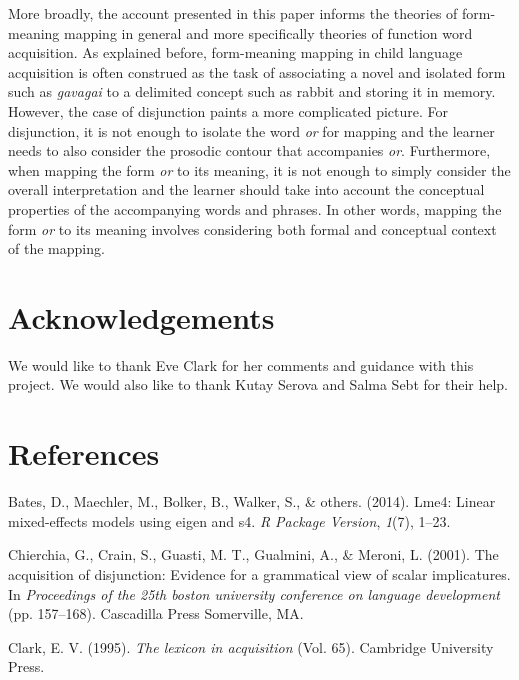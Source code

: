 \documentclass[10pt, letterpaper]{article}
\begin{document}
More broadly, the account presented in this paper informs the theories
of form-meaning mapping in general and more specifically theories of
function word acquisition. As explained before, form-meaning mapping in
child language acquisition is often construed as the task of associating
a novel and isolated form such as \emph{gavagai} to a delimited concept
such as rabbit and storing it in memory. However, the case of
disjunction paints a more complicated picture. For disjunction, it is
not enough to isolate the word \emph{or} for mapping and the learner
needs to also consider the prosodic contour that accompanies \emph{or}.
Furthermore, when mapping the form \emph{or} to its meaning, it is not
enough to simply consider the overall interpretation and the learner
should take into account the conceptual properties of the accompanying
words and phrases. In other words, mapping the form \emph{or} to its
meaning involves considering both formal and conceptual context of the
mapping.

\section{Acknowledgements}\label{acknowledgements}

We would like to thank Eve Clark for her comments and guidance with this
project. We would also like to thank Kutay Serova and Salma Sebt for
their help.

\section{References}\label{references}

\setlength{\parindent}{-0.1in} \setlength{\leftskip}{0.125in} \noindent

\hypertarget{refs}{}
\hypertarget{ref-bates2014lme4}{}
Bates, D., Maechler, M., Bolker, B., Walker, S., \& others. (2014).
Lme4: Linear mixed-effects models using eigen and s4. \emph{R Package
Version}, \emph{1}(7), 1--23.

\hypertarget{ref-chierchia2001acquisition}{}
Chierchia, G., Crain, S., Guasti, M. T., Gualmini, A., \& Meroni, L.
(2001). The acquisition of disjunction: Evidence for a grammatical view
of scalar implicatures. In \emph{Proceedings of the 25th boston
university conference on language development} (pp. 157--168).
Cascadilla Press Somerville, MA.

\hypertarget{ref-clark1995lexicon}{}
Clark, E. V. (1995). \emph{The lexicon in acquisition} (Vol. 65).
Cambridge University Press.
\end{document}
